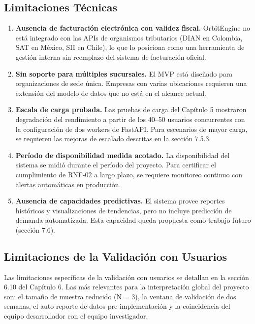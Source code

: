 \subsection{Limitaciones Técnicas}\label{limitaciones-tuxe9cnicas}

\begin{enumerate}
\def\labelenumi{\arabic{enumi}.}
\item
  \textbf{Ausencia de facturación electrónica con validez fiscal.} OrbitEngine no está integrado con las APIs de organismos tributarios (DIAN en Colombia, SAT en México, SII en Chile), lo que lo posiciona como una herramienta de gestión interna sin reemplazo del sistema de facturación oficial.
\item
  \textbf{Sin soporte para múltiples sucursales.} El MVP está diseñado para organizaciones de sede única. Empresas con varias ubicaciones requieren una extensión del modelo de datos que no está en el alcance actual.
\item
  \textbf{Escala de carga probada.} Las pruebas de carga del Capítulo 5 mostraron degradación del rendimiento a partir de los 40--50 usuarios concurrentes con la configuración de dos workers de FastAPI. Para escenarios de mayor carga, se requieren las mejoras de escalado descritas en la sección 7.5.3.
\item
  \textbf{Período de disponibilidad medida acotado.} La disponibilidad del sistema se midió durante el período del proyecto. Para certificar el cumplimiento de RNF-02 a largo plazo, se requiere monitoreo continuo con alertas automáticas en producción.
\item
  \textbf{Ausencia de capacidades predictivas.} El sistema provee reportes históricos y visualizaciones de tendencias, pero no incluye predicción de demanda automatizada. Esta capacidad queda propuesta como trabajo futuro (sección 7.6).
\end{enumerate}

\subsection{Limitaciones de la Validación con Usuarios}\label{limitaciones-de-la-validaciuxf3n-con-usuarios}

Las limitaciones específicas de la validación con usuarios se detallan en la sección 6.10 del Capítulo 6. Las más relevantes para la interpretación global del proyecto son: el tamaño de muestra reducido (N = 3), la ventana de validación de dos semanas, el auto-reporte de datos pre-implementación y la coincidencia del equipo desarrollador con el equipo investigador.

